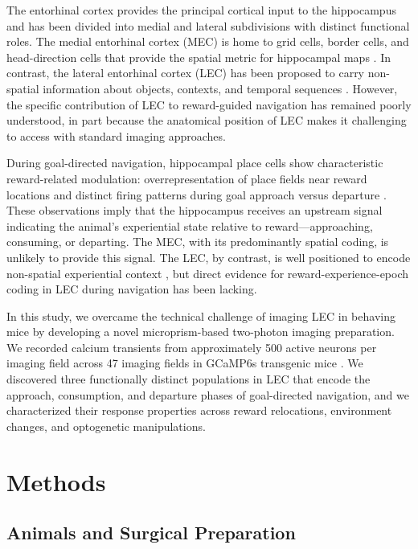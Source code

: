 \documentclass[12pt]{article}
\begin{document}
The entorhinal cortex provides the principal cortical input to the hippocampus and has been divided into medial and lateral subdivisions with distinct functional roles. The medial entorhinal cortex (MEC) is home to grid cells, border cells, and head-direction cells that provide the spatial metric for hippocampal maps \citep{hafting2005microstructure, stensola2012entorhinal}. In contrast, the lateral entorhinal cortex (LEC) has been proposed to carry non-spatial information about objects, contexts, and temporal sequences \citep{deshmukh2011representation, tsao2018traces}. However, the specific contribution of LEC to reward-guided navigation has remained poorly understood, in part because the anatomical position of LEC makes it challenging to access with standard imaging approaches.

During goal-directed navigation, hippocampal place cells show characteristic reward-related modulation: overrepresentation of place fields near reward locations and distinct firing patterns during goal approach versus departure \citep{gauthier2018dedicated, eichenbaum2014time}. These observations imply that the hippocampus receives an upstream signal indicating the animal's experiential state relative to reward---approaching, consuming, or departing. The MEC, with its predominantly spatial coding, is unlikely to provide this signal. The LEC, by contrast, is well positioned to encode non-spatial experiential context \citep{woods2020history}, but direct evidence for reward-experience-epoch coding in LEC during navigation has been lacking.

In this study, we overcame the technical challenge of imaging LEC in behaving mice by developing a novel microprism-based two-photon imaging preparation. We recorded calcium transients from approximately 500 active neurons per imaging field across 47 imaging fields in GCaMP6s transgenic mice \citep{chen2013ultrasensitive}. We discovered three functionally distinct populations in LEC that encode the approach, consumption, and departure phases of goal-directed navigation, and we characterized their response properties across reward relocations, environment changes, and optogenetic manipulations.

\section{Methods}

\subsection{Animals and Surgical Preparation}
\end{document}
